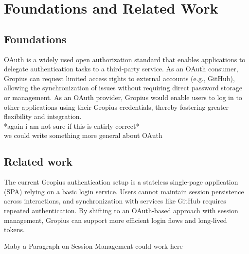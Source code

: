 
\chapter{Foundations and Related Work}
\label{chap:foundation}




\section{Foundations}

OAuth is a widely used open authorization standard that enables applications to delegate authentication tasks to a third-party service.
As an OAuth consumer, Gropius can request limited access rights to external accounts (e.g., GitHub),
allowing the synchronization of issues without requiring direct password storage or management.
As an OAuth provider, Gropius would enable users to log in to other applications using their Gropius credentials,
thereby fostering greater flexibility and integration. \\ *again i am not sure if this is entirly correct*\\

we could write something more general about OAuth

\section{Related work}
The current Gropius authentication setup is a stateless single-page application (SPA) relying on a basic login service.
Users cannot maintain session persistence across interactions, and synchronization with services like GitHub requires repeated authentication.
By shifting to an OAuth-based approach with session management, Gropius can support more efficient login flows and long-lived tokens.

Maby a Paragraph on Session Management could work here


